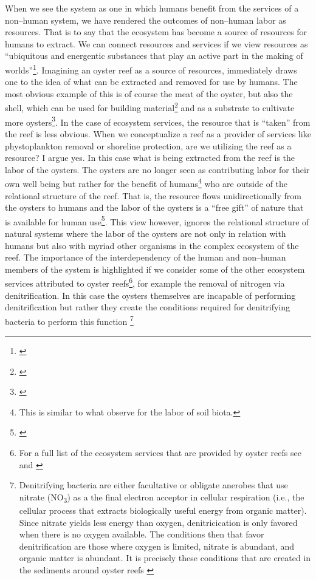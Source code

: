 \documentclass{article}
\begin{document}
{When we see the system as one in which humans benefit from the services of a non--human system, we have rendered the outcomes of non--human labor as resources. That is to say that the ecosystem has become a source of resources for humans to extract. We can connect resources and services if we view resources as ``ubiquitous and energentic substances that play an active part in the making of worlds''\footnote{\cite[p. 6]{richardson_introduction_2014}}. Imagining an oyster reef as a source of resources, immediately draws one to the idea of what can be extracted and removed for use by humans. The most obvious example of this is of course the meat of the oyster, but also the shell, which can be used for building material\footnote{\cite{}} and as a substrate to cultivate more oysters\footnote{\cite{}}. In the case of ecosystem services, the resource that is ``taken'' from the reef is less obvious. When we conceptualize a reef as a provider of services like phystoplankton removal or shoreline protection, are we utilizing the reef as a resource? I argue yes. In this case what is being extracted from the reef is the labor of the oysters. The oysters are no longer seen as contributing labor for their own well being but rather for the benefit of humans\footnote{This is similar to what  observe for the labor of soil biota.} who are outside of the relational structure of the reef. That is, the resource flows unidirectionally from the oysters to humans and the labor of the oysters is a ``free gift'' of nature that is available for human use\footnote{\cite{richardson_introduction_2014, battistoni_bringing_2017}}. This view however, ignores the relational structure of natural systems where the labor of the oysters are not only in relation with humans but also with myriad other organisms in the complex ecosystem of the reef. The importance of the interdependency of the human and non--human members of the system is highlighted if we consider some of the other ecosystem services attributed to oyster reefs\footnote{For a full list of the ecosystem services that are provided by oyster reefs see \cite{grabowski_economic_2012} and \cite{}}, for example the removal of nitrogen via denitrification. In this case the oysters themselves are incapable of performing denitrification but rather they create the conditions required for denitrifying bacteria to perform this function
\footnote{Denitrifying bacteria are either facultative or obligate anerobes that use nitrate (NO\textsubscript{3}) as a the final electron acceptor in cellular respiration (i.e., the cellular process that extracts biologically useful energy from organic matter). Since nitrate yields less energy than oxygen, denitricication is only favored when there is no oxygen available. The conditions then that favor denitrification are those where oxygen is limited, nitrate is abundant, and organic matter is abundant. It is precisely these conditions that are created in the sediments around oyster reefs \cite{smyth_assessing_2013}}
}
\end{document}
